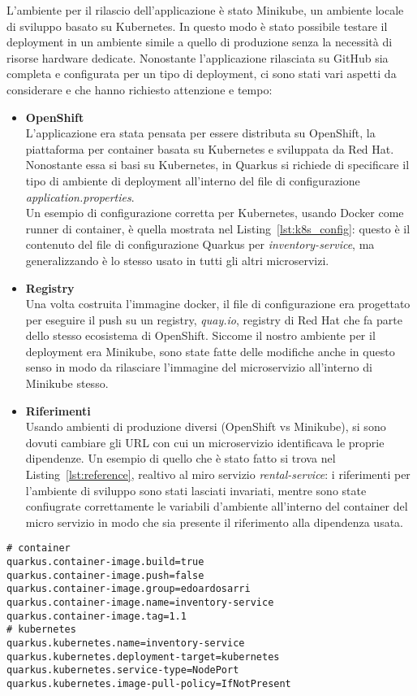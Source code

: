 L'ambiente per il rilascio dell'applicazione è stato Minikube, un ambiente locale di sviluppo basato su Kubernetes. In questo modo è stato possibile testare il deployment in un ambiente simile a quello di produzione senza la necessità di risorse hardware dedicate. Nonostante l'applicazione rilasciata su GitHub sia completa e configurata per un tipo di deployment, ci sono stati vari aspetti da considerare e che hanno richiesto attenzione e tempo:
\begin{itemize}
    \item \textbf{OpenShift} \\
        L'applicazione era stata pensata per essere distributa su OpenShift, la piattaforma per container basata su Kubernetes e sviluppata da Red Hat. Nonostante essa si basi su Kubernetes, in Quarkus si richiede di specificare il tipo di ambiente di deployment all'interno del file di configurazione \textit{application.properties}. \\
        Un esempio di configurazione corretta per Kubernetes, usando Docker come runner di container, è quella mostrata nel Listing~\ref{lst:k8s_config}: questo è il contenuto del file di configurazione Quarkus per \textit{inventory-service}, ma generalizzando è lo stesso usato in tutti gli altri microservizi.
    \item \textbf{Registry} \\
        Una volta costruita l'immagine docker, il file di configurazione era progettato per eseguire il push su un registry, \textit{quay.io}, registry di Red Hat che fa parte dello stesso ecosistema di OpenShift. Siccome il nostro ambiente per il deployment era Minikube, sono state fatte delle modifiche anche in questo senso in modo da rilasciare l'immagine del microservizio all'interno di Minikube stesso.
    \item \textbf{Riferimenti} \\
        Usando ambienti di produzione diversi (OpenShift vs Minikube), si sono dovuti cambiare gli URL con cui un microservizio identificava le proprie dipendenze. Un esempio di quello che è stato fatto si trova nel Listing~\ref{lst:reference}, realtivo al miro servizio \textit{rental-service}: i riferimenti per l'ambiente di sviluppo sono stati lasciati invariati, mentre sono state confiugrate correttamente le variabili d'ambiente all'interno del container del micro servizio in modo che sia presente il riferimento alla dipendenza usata.
\end{itemize}

\begin{lstlisting}[caption=Kubernetes Configuration, label=lst:k8s_config]
# container
quarkus.container-image.build=true
quarkus.container-image.push=false
quarkus.container-image.group=edoardosarri
quarkus.container-image.name=inventory-service
quarkus.container-image.tag=1.1
# kubernetes
quarkus.kubernetes.name=inventory-service
quarkus.kubernetes.deployment-target=kubernetes
quarkus.kubernetes.service-type=NodePort
quarkus.kubernetes.image-pull-policy=IfNotPresent
\end{lstlisting}

